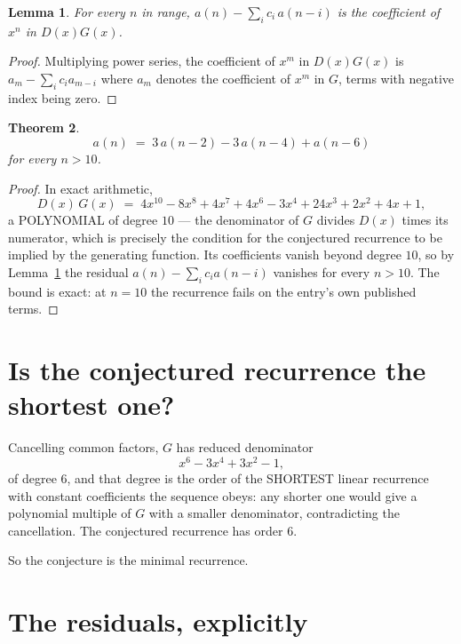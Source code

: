 \documentclass[11pt,a4paper]{article}
\theoremstyle{plain}
\newtheorem{theorem}{Theorem}
\newtheorem{lemma}[theorem]{Lemma}
\theoremstyle{definition}
\begin{document}
\begin{lemma}\label{lem:key}
For every $n$ in range, $a(n)-\sum_i c_i\,a(n-i)$ is the coefficient of $x^{n}$ in
$D(x)G(x)$.
\end{lemma}

\begin{proof}
Multiplying power series, the coefficient of $x^{m}$ in $D(x)G(x)$ is
$a_m-\sum_i c_i a_{m-i}$ where $a_m$ denotes the coefficient of $x^{m}$ in $G$, terms with
negative index being zero.
\end{proof}

\begin{theorem}
\[
a(n)\;=\;3\,a(n-2) - 3\,a(n-4) + a(n-6)
\]
for every $n>10$.
\end{theorem}

\begin{proof}
In exact arithmetic,
\[
D(x)\,G(x)\;=\;4 x^{10} - 8 x^{8} + 4 x^{7} + 4 x^{6} - 3 x^{4} + 24 x^{3} + 2 x^{2} + 4 x + 1,
\]
a POLYNOMIAL of degree $10$ --- the denominator of $G$ divides $D(x)$ times its numerator,
which is precisely the condition for the conjectured recurrence to be implied by the
generating function. Its coefficients vanish beyond degree $10$, so by
Lemma~\ref{lem:key} the residual $a(n)-\sum_ic_ia(n-i)$ vanishes for every
$n>10$. The bound is exact: at $n=10$ the recurrence fails on the entry's own published terms.
\end{proof}

\section{Is the conjectured recurrence the shortest one?}

Cancelling common factors, $G$ has reduced denominator
\[
x^{6} - 3 x^{4} + 3 x^{2} - 1,
\]
of degree $6$, and that degree is the order of the SHORTEST linear recurrence with
constant coefficients the sequence obeys: any shorter one would give a polynomial multiple of
$G$ with a smaller denominator, contradicting the cancellation. The conjectured recurrence has
order $6$.

So the conjecture is the minimal recurrence.

\section{The residuals, explicitly}
\end{document}
